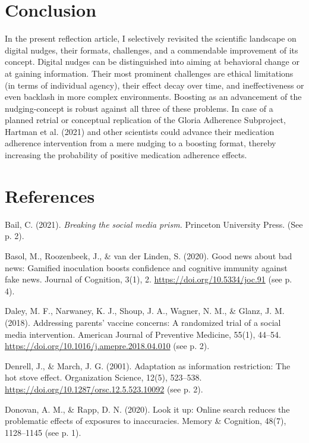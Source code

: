 \documentclass[reflection, authordate]{jote-new-article}
\begin{document}
\section{Conclusion}



In the present reflection article, I selectively revisited the scientific landscape on digital nudges, their formats, challenges, and a commendable improvement of its concept. Digital nudges can be distinguished into aiming at behavioral change or at gaining information. Their most prominent challenges are ethical limitations (in terms of individual agency), their effect decay over time, and ineffectiveness or even backlash in more complex environments. Boosting as an advancement of the nudging-concept is robust against all three of these problems. In case of a planned retrial or conceptual replication of the Gloria Adherence Subproject, Hartman et al. (2021) and other scientists could advance their medication adherence intervention from a mere nudging to a boosting format, thereby increasing the probability of positive medication adherence effects.


\section{References}


Bail, C. (2021). \emph{Breaking the social media prism.} Princeton University Press. (See p. 2).

Basol, M., Roozenbeek, J., \& van der Linden, S. (2020). Good news about bad news: Gamified inoculation boosts confidence and cognitive immunity
against fake news. Journal of Cognition, 3(1), 2. \url{https://doi.org/10.5334/joc.91} (see p. 4).

Daley, M. F., Narwaney, K. J., Shoup, J. A., Wagner, N. M., \& Glanz, J. M. (2018). Addressing parents’ vaccine concerns: A randomized trial of a social
media intervention. American Journal of Preventive Medicine, 55(1), 44–54. \url{https://doi.org/10.1016/j.amepre.2018.04.010} (see p. 2).

Denrell, J., \& March, J. G. (2001). Adaptation as information restriction: The hot stove effect. Organization Science, 12(5), 523–538. \url{https://doi.org/10.1287/orsc.12.5.523.10092} (see p. 2).

Donovan, A. M., \& Rapp, D. N. (2020). Look it up: Online search reduces the problematic effects of exposures to inaccuracies. Memory \& Cognition, 48(7), 1128–1145 (see p. 1).
\end{document}
